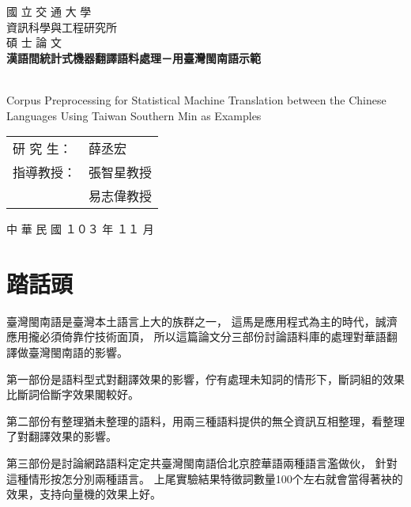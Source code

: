 \documentclass[final,oneside,onecolumn,12pt,a4paper]{book}%
\begin{document}
\begin{titlepage}

\begin{center}

   

\textsc{\Huge 國 立 交 通 大 學} %
\\[2em]
\textsc{\LARGE 資訊科學與工程研究所} %
\\[2em]
\textsc{\LARGE 碩 士 論 文} %
\\[3em]

{\huge \bfseries 漢語間統計式機器翻譯語料處理－用臺灣閩南語示範 } %

\\[1em]
{\LARGE Corpus Preprocessing for Statistical Machine Translation between the Chinese Languages Using Taiwan Southern Min as Examples}
\\[3em]

\begin{table}[H]
\centering
\Large
\begin{tabular}{ll}
研 究 生： & 薛丞宏\\ %
指導教授： & 張智星教授\\ %
 & 易志偉教授\\ %
\end{tabular}
\end{table}

\vfill

{\large 中 華 民 國  １０３  年  １１  月}

\end{center}

\end{titlepage}


\frontmatter
\chapter{踏話頭}
臺灣閩南語是臺灣本土語言上大的族群之一，
這馬是應用程式為主的時代，誠濟應用攏必須倚靠佇技術面頂，
所以這篇論文分三部份討論語料庫的處理對華語翻譯做臺灣閩南語的影響。

第一部份是語料型式對翻譯效果的影響，佇有處理未知詞的情形下，斷詞組的效果比斷詞佮斷字效果閣較好。

第二部份有整理猶未整理的語料，用兩三種語料提供的無仝資訊互相整理，看整理了對翻譯效果的影響。

第三部份是討論網路語料定定共臺灣閩南語佮北京腔華語兩種語言濫做伙，
針對這種情形按怎分別兩種語言。
上尾實驗結果特徵詞數量100个左右就會當得著袂的效果，支持向量機的效果上好。
\end{document}
